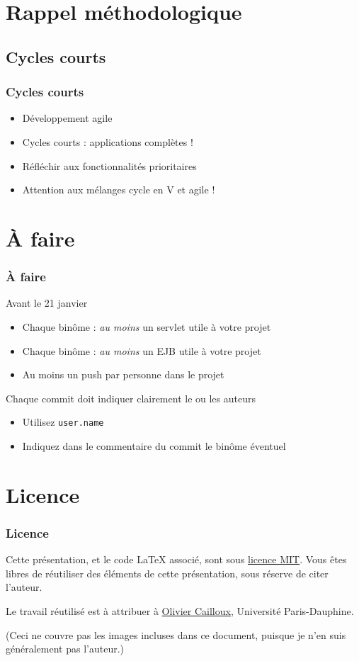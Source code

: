 \documentclass[english, french]{beamer}
\begin{document}
\section{Rappel méthodologique}
\subsection{Cycles courts}
\begin{frame}
	\frametitle{Cycles courts}
	\begin{itemize}
		\item Développement agile
		\item Cycles courts : applications complètes !
		\item Réfléchir aux fonctionnalités prioritaires
		\item Attention aux mélanges cycle en V et agile !
	\end{itemize}
\end{frame}

\section{À faire}
\begin{frame}
	\frametitle{À faire}
	\begin{block}{Avant le 21 janvier}
		\begin{itemize}
			\item[+\footnote{Le + indique que cet aspect intervient dans la note}] Chaque binôme : \emph{au moins} un servlet utile à votre projet
			\item[+] Chaque binôme : \emph{au moins} un EJB utile à votre projet
			\item[+] Au moins un push par personne dans le projet
		\end{itemize}
	\end{block}
	Chaque commit doit indiquer clairement le ou les auteurs
	\begin{itemize}
		\item Utilisez \texttt{user.name}
		\item Indiquez dans le commentaire du commit le binôme éventuel
	\end{itemize}
\end{frame}

\appendix
\AtBeginSection{
}
\section{Licence}
\begin{frame}
	\frametitle{Licence}
	Cette présentation, et le code LaTeX associé, sont sous \href{http://opensource.org/licenses/MIT}{licence MIT}. Vous êtes libres de réutiliser des éléments de cette présentation, sous réserve de citer l’auteur.
	
	Le travail réutilisé est à attribuer à \href{http://www.lamsade.dauphine.fr/~ocailloux/}{Olivier Cailloux}, Université Paris-Dauphine.
	
	\small{(Ceci ne couvre pas les images incluses dans ce document, puisque je n’en suis généralement pas l’auteur.)}
\end{frame}
\end{document}
